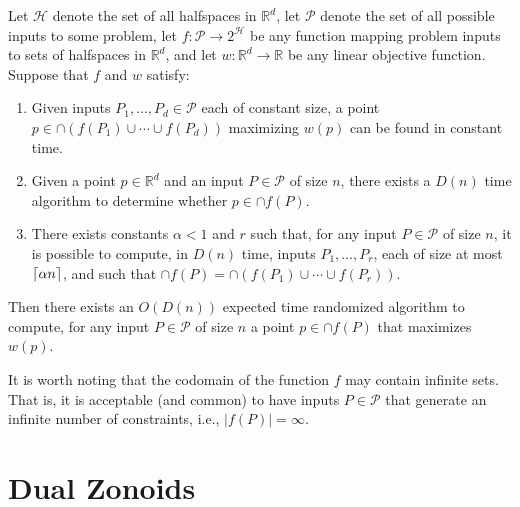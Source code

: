 \documentclass[lotsofwhite]{patmorin}
\begin{document}
\begin{thm}[Chan 2004]
Let $\mathcal{H}$ denote the set of all halfspaces in $\mathbb{R}^d$,
let $\mathcal{P}$ denote the set of all possible inputs to some problem, 
let $f:\mathcal{P}\rightarrow 2^{\mathcal{H}}$ be any function mapping 
problem inputs to sets of halfspaces in $\mathbb{R}^d$,
and let $w:\mathbb{R}^d\rightarrow \mathbb{R}$ be
any linear objective function.  Suppose that $f$ and $w$ satisfy:
\begin{enumerate}

\item Given inputs $P_1,\ldots,P_d\in\mathcal{P}$ each of constant
size, a point $p\in\cap (f(P_1)\cup\cdots\cup f(P_d))$ maximizing
$w(p)$ can be found in constant time.

\item Given a point $p\in\mathbb{R}^d$ and an input $P\in\mathcal{P}$
of size $n$, there exists a $D(n)$ time algorithm to determine whether
$p\in\cap f(P)$.

\item There exists constants $\alpha < 1$ and $r$ such that, for any
input $P\in\mathcal{P}$ of size $n$, it is possible to compute, in
$D(n)$ time, inputs $P_1,\ldots,P_r$, each of size at most
$\left\lceil \alpha n \right\rceil$, and such that $\cap f(P) =
\cap(f(P_1)\cup\cdots\cup f(P_r))$.

\end{enumerate}
Then there exists an $O(D(n))$ expected time randomized algorithm to
compute, for any input $P\in\mathcal{P}$ of size $n$ a point
$p\in\cap f(P)$ that maximizes $w(p)$.
\end{thm}

It is worth noting that the codomain of the function $f$ may contain
infinite sets.  That is, it is acceptable (and common) to have inputs
$P\in\mathcal{P}$ that generate an infinite number of constraints,
i.e., $|f(P)|=\infty$.


\section{Dual Zonoids}
\end{document}

